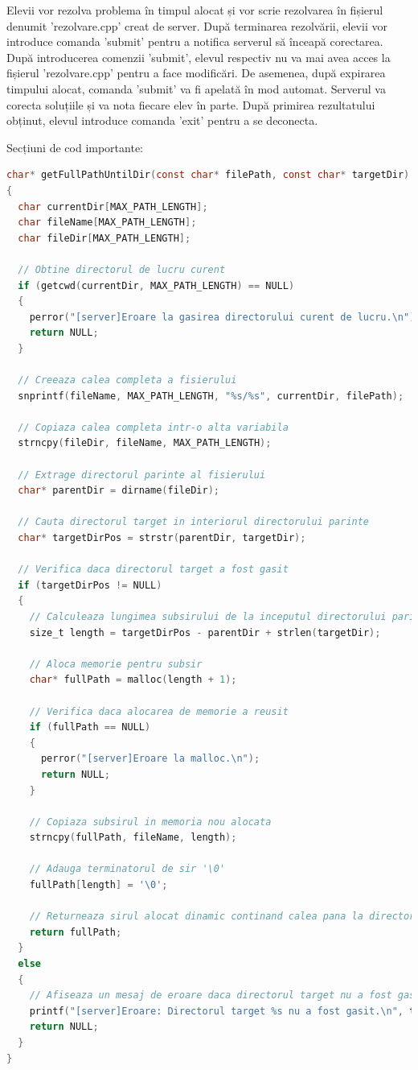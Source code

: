 \documentclass[runningheads]{llncs}
\begin{document}
\hspace{1em}Elevii vor rezolva problema în timpul alocat și vor scrie rezolvarea în fișierul denumit 'rezolvare.cpp' creat de server.
După terminarea rezolvării, elevii vor introduce comanda 'submit' pentru a notifica serverul să înceapă corectarea. După introducerea comenzii 'submit', elevul respectiv nu va mai avea acces la fișierul 'rezolvare.cpp' pentru a face modificări. De asemenea, după expirarea timpului alocat, comanda 'submit' va fi apelată în mod automat.
Serverul va corecta soluțiile și va nota fiecare elev în parte.
După primirea rezultatului obținut, elevul introduce comanda 'exit' pentru a se deconecta.

\hspace{1em} Secțiuni de cod importante:
\begin{lstlisting}[language=C, caption={Functia pentru obtinerea caii complete a unui fisier pana la un director specificat}, label={lst:getFullPathUntilDir}]
char* getFullPathUntilDir(const char* filePath, const char* targetDir)
{
  char currentDir[MAX_PATH_LENGTH];
  char fileName[MAX_PATH_LENGTH];
  char fileDir[MAX_PATH_LENGTH];
  
  // Obtine directorul de lucru curent
  if (getcwd(currentDir, MAX_PATH_LENGTH) == NULL)
  {
    perror("[server]Eroare la gasirea directorului curent de lucru.\n");
    return NULL;
  }
  
  // Creeaza calea completa a fisierului
  snprintf(fileName, MAX_PATH_LENGTH, "%s/%s", currentDir, filePath);
  
  // Copiaza calea completa intr-o alta variabila
  strncpy(fileDir, fileName, MAX_PATH_LENGTH);
  
  // Extrage directorul parinte al fisierului
  char* parentDir = dirname(fileDir);
  
  // Cauta directorul target in interiorul directorului parinte
  char* targetDirPos = strstr(parentDir, targetDir);
  
  // Verifica daca directorul target a fost gasit
  if (targetDirPos != NULL)
  {
    // Calculeaza lungimea subsirului de la inceputul directorului parinte pana la sfarsitul directorului target
    size_t length = targetDirPos - parentDir + strlen(targetDir);
  
    // Aloca memorie pentru subsir
    char* fullPath = malloc(length + 1);
  
    // Verifica daca alocarea de memorie a reusit
    if (fullPath == NULL)
    {
      perror("[server]Eroare la malloc.\n");
      return NULL;
    }
  
    // Copiaza subsirul in memoria nou alocata
    strncpy(fullPath, fileName, length);
  
    // Adauga terminatorul de sir '\0'
    fullPath[length] = '\0';
  
    // Returneaza sirul alocat dinamic continand calea pana la directorul target
    return fullPath;
  }
  else
  {
    // Afiseaza un mesaj de eroare daca directorul target nu a fost gasit
    printf("[server]Eroare: Directorul target %s nu a fost gasit.\n", targetDir);
    return NULL;
  }
}
\end{lstlisting}
\end{document}

